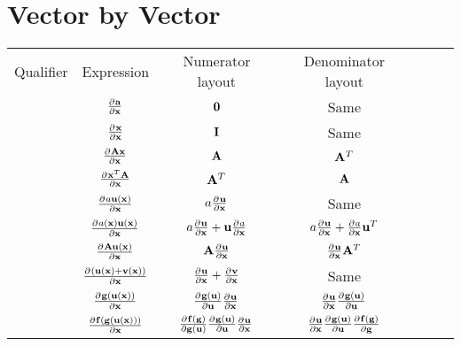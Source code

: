 \section{Vector by Vector}
\begin{center}
\begin{tabular}{l|Sc|Sc|Sc}
Qualifier                  & Expression                                    & Numerator layout                                   & Denominator layout                            \\
                           & $\pd{\va}{\vx}$                               & $\vzero$                                           & Same                                          \\ %
                           & $\pd{\vx}{\vx}$                               & $\mI$                                              & Same                                          \\ %
                           & $\pd{\mA\vx}{\vx}$                            & $\mA$                                              & $\mA^T$                                       \\
                           & $\pd{\vx^T\mA}{\vx}$                          & $\mA^T$                                            & $\mA$                                         \\
                           & $\pd{a\vu(\vx)}{\vx}$                         & $a\pd{\vu}{\vx}$                                   & Same                                          \\
                           & $\pd{a(\vx)\vu(\vx)}{\vx}$                    & $a\pd{\vu}{\vx}+\vu\pd{a}{\vx}$                    & $a\pd{\vu}{\vx}+\pd{a}{\vx}\vu^T$             \\
                           & $\pd{\mA\vu(\vx)}{\vx}$                       & $\mA\pd{\vu}{\vx}$                                 & $\pd{\vu}{\vx}\mA^T$                          \\
                           & $\pd{(\vu(\vx)+\vv(\vx))}{\vx}$               & $\pd{\vu}{\vx}+\pd{\vv}{\vx}$                      & Same                                          \\
                           & $\pd{\vg(\vu(\vx))}{\vx}$                     & $\pd{\vg(\vu)}{\vu}\pd{\vu}{\vx}$                  & $\pd{\vu}{\vx}\pd{\vg(\vu)}{\vu}$             \\
                           & $\pd{\vf(\vg(\vu(\vx)))}{\vx}$                & $\pd{\vf(\vg)}{\vg(\vu)}\pd{\vg(\vu)}{\vu}\pd{\vu}{\vx}$& $\pd{\vu}{\vx}\pd{\vg(\vu)}{\vu}\pd{\vf(\vg)}{\vg}$
\end{tabular}
\end{center}



